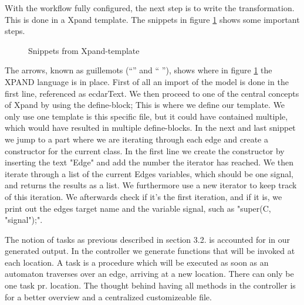 With the workflow fully configured, the next step is to write the
transformation. This is done in a Xpand template. The snippets in figure
\ref{xpand-example} shows some important steps.

\begin{figure}[t]



\caption{Snippets from Xpand-template \label{xpand-example}}
\end{figure}

The arrows, known as guillemots (``\guillemotleft'' and `` \guillemotright''),
shows where in figure \ref{xpand-example} the XPAND language is in place. First
of all an import of the model is done in the first line, referenced as
ecdarText. We then proceed to one of the central concepts of Xpand by using the
define-block; This is where we define our template. We only use one template is
this specific file, but it could have contained multiple, which would have
resulted in multiple define-blocks. In the next and last snippet we jump to a
part where we are iterating through each edge and create a constructor for the
current class. In the first line we create the constructor by inserting the text
"Edge" and add the number the iterator has reached. We then iterate through a
list of the current Edges variables, which should be one signal, and returns the
results as a list. We furthermore use a new iterator to keep track of this
iteration. We afterwards check if it's the first iteration, and if it is, we
print out the edges target name and the variable signal, such as "super(C,
"signal");".

The notion of tasks as previous described in section 3.2. is accounted for in
our generated output. In the controller we generate functions that will be
invoked at each location. A task is a procedure which will be executed as soon
as an automaton traverses over an edge, arriving at a new location. There can
only be one task pr. location. The thought behind having all methods in the
controller is for a better overview and a centralized customizeable file.
